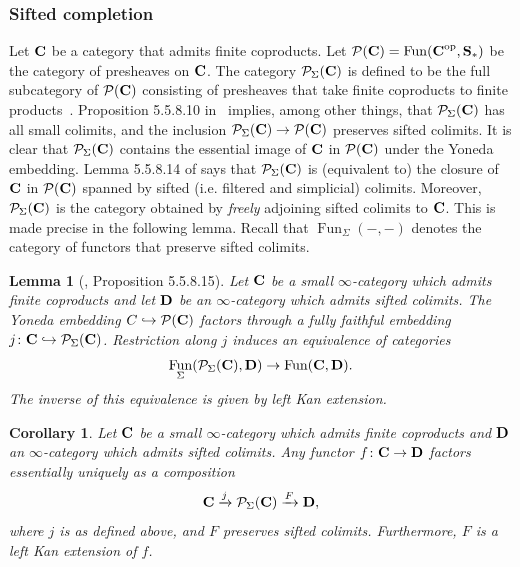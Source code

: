 \documentclass[psamsfonts]{amsart}
\theoremstyle{plain}
\newtheorem{cor}[thm]{Corollary}
\newtheorem{lem}[thm]{Lemma}
\theoremstyle{definition}
\theoremstyle{remark}
\newcommand{\catname}[1]{{\normalfont\textbf{#1}}}
\newcommand{\op}{{\mathrm{op}}}
\newcommand{\spaces}{\catname{S}_*}
\newcommand{\presh}{\mathcal{P}}
\DeclareMathOperator{\fun}{Fun}
\begin{document}
\subsubsection{Sifted completion}\label{section:sifted completion} Let $\catname{C}$ be a category that admits finite coproducts. Let $\presh(\catname{C})=\fun(\catname{C}^{\op}, \spaces)$ be the category of presheaves on $\catname{C}$. The category $\presh_{\Sigma}(\catname{C})$ is defined to be the full subcategory of $\presh(\catname{C})$ consisting of presheaves that take finite coproducts to finite products~\cite[Definition 5.5.8.8]{LurieHTT}.  Proposition 5.5.8.10 in~\cite{LurieHTT} implies, among other things, that $\presh_{\Sigma}(\catname{C})$ has all small colimits, and the inclusion $\presh_{\Sigma}(\catname{C}) \to \presh(\catname{C})$ preserves sifted colimits. It is clear that $\presh_{\Sigma}(\catname{C})$ contains the essential image of $\catname{C}$ in $\presh(\catname{C})$ under the Yoneda embedding. Lemma 5.5.8.14 of \cite{LurieHTT} says that $\presh_{\Sigma}(\catname{C})$ is (equivalent to) the closure of $\catname{C}$ in $\presh(\catname{C})$ spanned by sifted (i.e. filtered and simplicial) %
colimits. Moreover, $\presh_{\Sigma}(\catname{C})$ is the category obtained by \emph{freely} adjoining sifted colimits to $\catname{C}$. This is made precise in the following lemma. Recall that $\fun_{\Sigma}(-, -)$ denotes the category of functors that preserve sifted colimits.
\begin{lem}[\cite{LurieHTT}, Proposition 5.5.8.15]\label{lem:sifted yoneda}
Let $\catname{C}$ be a small $\infty$-category which admits finite
coproducts and let $\catname{D}$ be an $\infty$-category which admits sifted colimits. The Yoneda embedding $C\hookrightarrow \presh(\catname{C})$ factors through a fully faithful embedding $j\colon \catname{C}\hookrightarrow \presh_{\Sigma}(\catname{C})$. Restriction along $j$ induces an
equivalence of categories
\[
\fun_{\Sigma}(\presh_{\Sigma}(\catname{C}), \catname{D}) \to \fun(\catname{C}, \catname{D}).
\]
The inverse of this equivalence is given by left Kan extension.
\end{lem}
\begin{cor}\label{cor:psigma}
Let $\catname{C}$ be a small $\infty$-category which admits finite
coproducts and $\catname{D}$ an $\infty$-category which admits sifted colimits. Any functor $f\colon \catname{C} \to \catname{D}$ factors essentially uniquely as a composition
\[
\catname{C}\xrightarrow{j} \presh_{\Sigma}(\catname{C})\xrightarrow{F} \catname{D},
\]
where $j$ is as defined above, and $F$ preserves sifted colimits. Furthermore, $F$ is a left Kan extension of $f$.
\end{cor}
\end{document}
